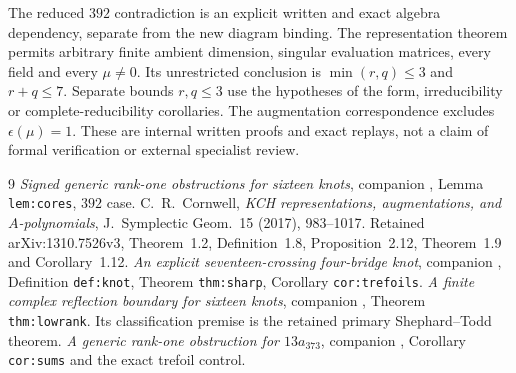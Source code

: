 \documentclass[11pt]{article}
\begin{document}
The reduced $392$ contradiction is an explicit written and exact
algebra dependency, separate from the new diagram binding.
The representation theorem permits arbitrary finite ambient
dimension, singular evaluation matrices, every field and every
$\mu\ne0$. Its unrestricted conclusion is
$\min(r,q)\le3$ and $r+q\le7$.
Separate bounds $r,q\le3$ use the hypotheses of the form,
irreducibility or complete-reducibility corollaries.
The augmentation correspondence excludes $\epsilon(\mu)=1$.
These are internal written proofs and exact replays, not a
claim of formal verification or external specialist review.

\begin{thebibliography}{9}\small
{} \emph{Signed generic rank-one obstructions for
sixteen knots}, companion ,
Lemma \texttt{lem:cores}, $392$ case.
 C.~R.~Cornwell,
\emph{KCH representations, augmentations, and $A$-polynomials},
J.\ Symplectic Geom.\ 15 (2017), 983--1017.
Retained arXiv:1310.7526v3, Theorem~1.2, Definition~1.8,
Proposition~2.12, Theorem~1.9 and Corollary~1.12.
 \emph{An explicit seventeen-crossing four-bridge knot},
companion ,
Definition \texttt{def:knot}, Theorem \texttt{thm:sharp},
Corollary \texttt{cor:trefoils}.
 \emph{A finite complex reflection boundary for
sixteen knots}, companion
,
Theorem \texttt{thm:lowrank}. Its classification premise is the
retained primary Shephard--Todd theorem.
 \emph{A generic rank-one obstruction for
$13a_{373}$}, companion ,
Corollary \texttt{cor:sums} and the exact trefoil control.
\end{thebibliography}
\end{document}
